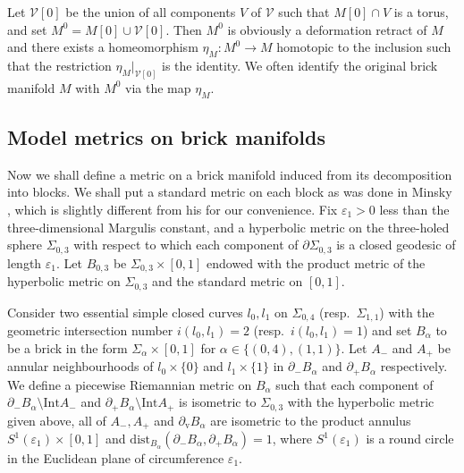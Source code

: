 \documentclass{amsart}
\theoremstyle{definition}
\numberwithin{figure}{section}
\numberwithin{equation}{section}
\def\v{\mathrm{v}}
\def\cv{\mathcal{V}}
\def\part{\partial}
\def\Int{\mathrm{Int}}
\def\ve{\varepsilon}
\def\Sg{\Sigma}
\def\dist{\mathrm{dist}}
\def\ve{\varepsilon}
\def\Sg{\Sigma}
\begin{document}
Let $\cv[0]$ be the union of all components $V$ of $\cv$ such that $M[0]\cap V$ is a 
torus, and set $M^0 =M[0]\cup \cv[0]$.
Then $M^0$ is obviously a deformation retract of $M$ and  there exists a homeomorphism $\eta_M:M^0\rightarrow M$  homotopic to the inclusion such that 
the restriction $\eta_M|_{\cv[0]}$ is the identity.
We often identify the original brick manifold $M$ with $M^0$ via the map $\eta_M$.



\subsection{Model metrics on brick manifolds}\label{SS_block_metric}
Now we shall define a metric on a brick manifold induced from its decomposition into blocks.
We shall put a standard metric on each block as was done in  Minsky \cite{mi2}, which is slightly different from his for our convenience.
Fix  $\ve_1>0$ less than the three-dimensional Margulis constant, and a hyperbolic metric on the three-holed sphere $\Sg_{0,3}$ with respect to which  each component of $\part \Sg_{0,3}$ is a closed geodesic of length $\ve_1$.
Let $B_{0,3}$ be $\Sg_{0,3}\times [0,1]$ endowed with the product metric of the hyperbolic metric on $\Sg_{0,3}$ and the standard metric on $[0,1]$.

Consider two essential simple closed curves $l_0,l_1$ on $\Sg_{0,4}$ (resp.\ $\Sg_{1,1}$) with 
the geometric intersection number $i(l_0,l_1)=2$ (resp.\ $i(l_0,l_1)=1$) and set $B_{\alpha}$ to be a brick in the form $\Sg_{\alpha}\times [0,1]$ for $\alpha\in \{(0,4),(1,1)\}$.
Let $A_-$ and $A_+$ be annular neighbourhoods of $l_0 \times \{0\}$ and $l_1 \times \{1\}$ in $\partial_- B_\alpha$ and $\partial_+ B_\alpha$ respectively.
We define a piecewise Riemannian metric on $B_\alpha$ such that each component of $\partial_-B_\alpha\setminus  \Int A_- $ and $\partial_+B_\alpha\setminus \Int A_+$ is isometric to $\Sg_{0,3}$ with the hyperbolic metric given above, all of $A_-,A_+$ and $\part_{\v}B_\alpha$ 
are isometric to the product annulus $S^1(\ve_1)\times [0,1]$ and 
$\dist_{B_{\alpha}}(\part_-B_{\alpha},\part_+ B_{\alpha})=1$, where $S^1(\ve_1)$ is a round circle in the Euclidean plane of circumference $\ve_1$.
\end{document}
